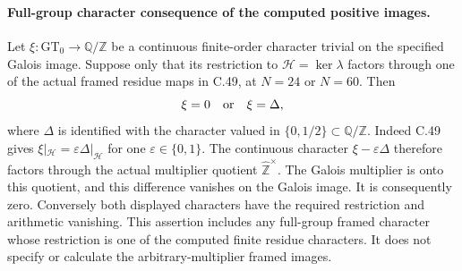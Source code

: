 \paragraph{Full-group character consequence of the computed positive images.}
Let $\xi:\widehat{\mathrm{GT}}_0\to\mathbb Q/\mathbb Z$ be a
continuous finite-order character trivial on the specified Galois
image. Suppose only that its restriction to
$\mathcal H=\ker\lambda$ factors through one of the actual framed
residue maps in C.49, at $N=24$ or $N=60$. Then
\[
                           \xi=0\quad\hbox{or}\quad\xi=\Delta,
\]
where $\Delta$ is identified with the character valued in
$\{0,1/2\}\subset\mathbb Q/\mathbb Z$.
Indeed C.49 gives $\xi|_{\mathcal H}=\varepsilon\Delta|_{\mathcal H}$
for one $\varepsilon\in\{0,1\}$. The continuous character
$\xi-\varepsilon\Delta$ therefore factors through the actual
multiplier quotient $\widehat{\mathbb Z}^{\times}$. The Galois
multiplier is onto this quotient, and this difference vanishes on
the Galois image. It is consequently zero. Conversely both displayed
characters have the required restriction and arithmetic vanishing.
This assertion includes any full-group framed character whose
restriction is one of the computed finite residue characters. It does
not specify or calculate the arbitrary-multiplier framed images.
